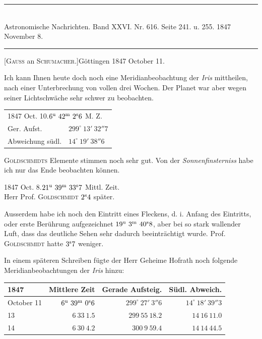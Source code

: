 \clearpage
{}
\begin{center}
\rule{0.55\linewidth}{0.4pt}\\[2pt]
Astronomische Nachrichten. Band XXVI. Nr. 616. Seite 241. u. 255. 1847 November 8.\\[2pt]
\rule{0.55\linewidth}{0.4pt}
\end{center}
\begin{center}[\textsc{Gauss} an \textsc{Schumacher}.]\quad Göttingen 1847 October 11.\end{center}

Ich kann Ihnen heute doch noch eine Meridianbeobachtung der \emph{Iris} mittheilen, nach einer Unterbrechung von vollen drei Wochen. Der Planet war aber wegen seiner Lichtschwäche sehr schwer zu beobachten.

\begin{center}
\begin{tabular}{ll}
\multicolumn{2}{l}{1847 Oct. 10.\quad $6^{\rm u}\ 42^{\rm m}\ 2^{\rm s}6$ M. Z.} \\
Ger. Aufst. & $299^\circ\ 13'\ 32''7$ \\
Abweichung südl. & $14^\circ\ 19'\ 38''6$ \\
\end{tabular}
\end{center}

\textsc{Goldschmidts} Elemente stimmen noch sehr gut. Von der \emph{Sonnenfinsterniss} habe ich nur das Ende beobachten können.

\begin{center}
1847 Oct. 8.\quad $21^{\rm u}\ 39^{\rm m}\ 33^{\rm s}7$ Mittl. Zeit.\\
Herr Prof. \textsc{Goldschmidt} $2^{\rm s}4$ später.
\end{center}

Ausserdem habe ich noch den Eintritt eines Fleckens, d. i. Anfang des Eintritts, oder erste Berührung aufgezeichnet $19^{\rm u}\ 3^{\rm m}\ 40^{\rm s}8$, aber bei so stark wallender Luft, dass das deutliche Sehen sehr dadurch beeinträchtigt wurde. Prof. \textsc{Goldschmidt} hatte $3^{\rm s}7$ weniger.

In einem späteren Schreiben fügte der Herr Geheime Hofrath noch folgende Meridianbeobachtungen der \emph{Iris} hinzu:

\begin{center}
\setlength{\tabcolsep}{4pt}
\begin{tabular}{l|r|r|r}
1847 & Mittlere Zeit & Gerade Aufsteig. & Südl. Abweich. \\\hline
October 11 & $6^{\rm u}\ 39^{\rm m}\ 0^{\rm s}6$ & $299^\circ\ 27'\ 3''6$ & $14^\circ\ 18'\ 39''3$ \\
\hfill 13 & $6\ 33\ 1.5$ & $299\ 55\ 18.2$ & $14\ 16\ 11.0$ \\
\hfill 14 & $6\ 30\ 4.2$ & $300\ 9\ 59.4$ & $14\ 14\ 44.5$ \\
\end{tabular}
\end{center}

